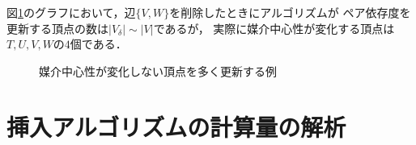 \begin{example}
  図\ref{fig:bc-many-phony}のグラフにおいて，辺$\{V,W\}$を削除したときにアルゴリズムが
  ペア依存度を更新する頂点の数は$\lvert V_\delta\rvert\sim \lvert V\rvert$であるが，
  実際に媒介中心性が変化する頂点は$T,U,V,W$の$4$個である．

  \begin{figure}[tb]
    \centering
    \def\svgwidth{\linewidth}
    
    \caption{媒介中心性が変化しない頂点を多く更新する例}
    \label{fig:bc-many-phony}
  \end{figure}
\end{example}

\section{挿入アルゴリズムの計算量の解析}
\label{subsect:computational-complexity-of-incremental-algorithm}

